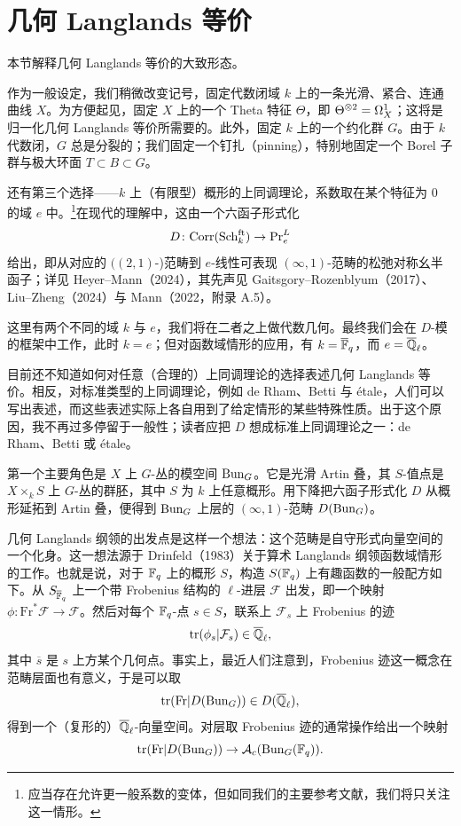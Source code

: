 \section{几何 Langlands 等价}

本节解释几何 Langlands 等价的大致形态。

作为一般设定，我们稍微改变记号，固定代数闭域 $k$ 上的一条光滑、紧合、连通曲线 $X$。为方便起见，固定 $X$ 上的一个 Theta 特征 $\Theta$，即 $\Theta^{\otimes 2} = \Omega^{1}_{X}$；这将是归一化几何 Langlands 等价所需要的。此外，固定 $k$ 上的一个约化群 $G$。由于 $k$ 代数闭，$G$ 总是分裂的；我们固定一个钉扎（pinning），特别地固定一个 Borel 子群与极大环面 $T \subset B \subset G$。

还有第三个选择——$k$ 上（有限型）概形的上同调理论，系数取在某个特征为 $0$ 的域 $e$ 中。\footnote{应当存在允许更一般系数的变体，但如同我们的主要参考文献，我们将只关注这一情形。}在现代的理解中，这由一个六函子形式化
\[
D \colon \mathrm{Corr}(\mathrm{Sch}_k^{\mathrm{ft}}) \to \mathrm{Pr}^{L}_e
\]
给出，即从对应的 $((2,1)$-)范畴到 $e$-线性可表现 $(\infty,1)$-范畴的松弛对称幺半函子；详见 Heyer–Mann（2024），其先声见 Gaitsgory–Rozenblyum（2017）、Liu–Zheng（2024）与 Mann（2022，附录 A.5）。

\begin{remark}
这里有两个不同的域 $k$ 与 $e$，我们将在二者之上做代数几何。最终我们会在 $D$-模的框架中工作，此时 $k = e$；但对函数域情形的应用，有 $k = \overline{\mathbb{F}}_q$，而 $e = \overline{\mathbb{Q}}_{\ell}$。
\end{remark}

目前还不知道如何对任意（合理的）上同调理论的选择表述几何 Langlands 等价。相反，对标准类型的上同调理论，例如 de Rham、Betti 与 étale，人们可以写出表述，而这些表述实际上各自用到了给定情形的某些特殊性质。出于这个原因，我不再过多停留于一般性；读者应把 $D$ 想成标准上同调理论之一：de Rham、Betti 或 étale。

第一个主要角色是 $X$ 上 $G$-丛的模空间 $\operatorname{Bun}_G$。它是光滑 Artin 叠，其 $S$-值点是 $X \times_k S$ 上 $G$-丛的群胚，其中 $S$ 为 $k$ 上任意概形。用下降把六函子形式化 $D$ 从概形延拓到 Artin 叠，便得到 $\operatorname{Bun}_G$ 上层的 $(\infty,1)$-范畴 $D(\operatorname{Bun}_G)$。

几何 Langlands 纲领的出发点是这样一个想法：这个范畴是自守形式向量空间的一个化身。这一想法源于 Drinfeld（1983）关于算术 Langlands 纲领函数域情形的工作。也就是说，对于 $\mathbb{F}_q$ 上的概形 $S$，构造 $S(\mathbb{F}_q)$ 上有趣函数的一般配方如下。从 $S_{\overline{\mathbb{F}}_q}$ 上一个带 Frobenius 结构的 $\ell$-进层 $\mathcal{F}$ 出发，即一个映射 $\phi \colon \mathrm{Fr}^*\mathcal{F} \to \mathcal{F}$。然后对每个 $\mathbb{F}_q$-点 $s \in S$，联系上 $\mathcal{F}_s$ 上 Frobenius 的迹
\[
\operatorname{tr}(\phi_s|\mathcal{F}_s) \in \overline{\mathbb{Q}}_{\ell},
\]
其中 $\overline{s}$ 是 $s$ 上方某个几何点。事实上，最近人们注意到，Frobenius 迹这一概念在范畴层面也有意义，于是可以取
\[
\operatorname{tr}(\mathrm{Fr}|D(\operatorname{Bun}_G)) \in D(\overline{\mathbb{Q}}_{\ell}),
\]
得到一个（复形的）$\overline{\mathbb{Q}}_{\ell}$-向量空间。对层取 Frobenius 迹的通常操作给出一个映射
\[
\operatorname{tr}(\mathrm{Fr}|D(\operatorname{Bun}_G)) \to \mathcal{A}_c(\operatorname{Bun}_G(\mathbb{F}_q)).
\]

